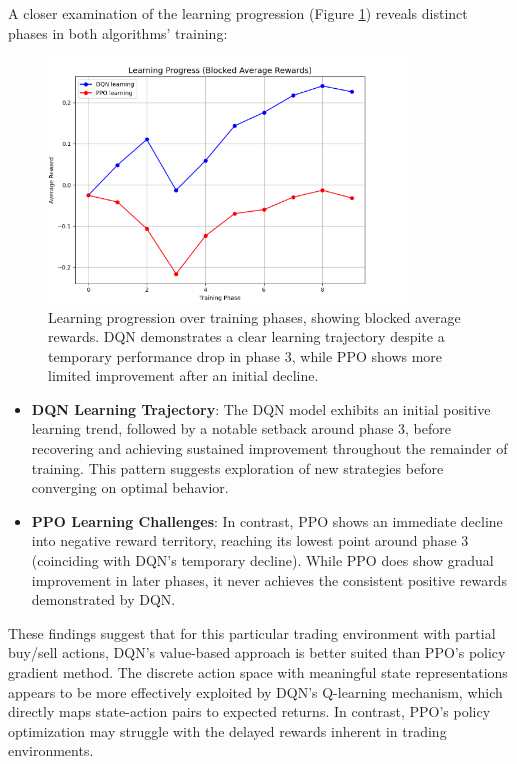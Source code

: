\documentclass[11pt]{article}
\begin{document}
A closer examination of the learning progression (Figure \ref{fig:learning_progress}) reveals distinct phases in both algorithms' training:

\begin{figure}[h]
  \centering
  \includegraphics[width=0.85\textwidth]{fig/Learning Progress average reward.png}
  \caption{Learning progression over training phases, showing blocked average rewards. DQN demonstrates a clear learning trajectory despite a temporary performance drop in phase 3, while PPO shows more limited improvement after an initial decline.}
  \label{fig:learning_progress}
\end{figure}

\begin{itemize}
  \item \textbf{DQN Learning Trajectory}: The DQN model exhibits an initial positive learning trend, followed by a notable setback around phase 3, before recovering and achieving sustained improvement throughout the remainder of training. This pattern suggests exploration of new strategies before converging on optimal behavior.
  
  \item \textbf{PPO Learning Challenges}: In contrast, PPO shows an immediate decline into negative reward territory, reaching its lowest point around phase 3 (coinciding with DQN's temporary decline). While PPO does show gradual improvement in later phases, it never achieves the consistent positive rewards demonstrated by DQN.
\end{itemize}

These findings suggest that for this particular trading environment with partial buy/sell actions, DQN's value-based approach is better suited than PPO's policy gradient method. The discrete action space with meaningful state representations appears to be more effectively exploited by DQN's Q-learning mechanism, which directly maps state-action pairs to expected returns. In contrast, PPO's policy optimization may struggle with the delayed rewards inherent in trading environments.
\end{document}
